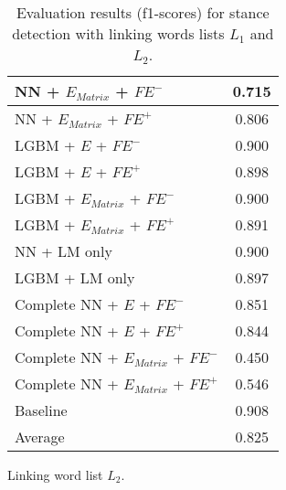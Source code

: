 \begin{table}[h]
\begin{subtable}{.5\textwidth}
\begin{tabular}{|| l || c ||}
 			\hline
 			NN + $E_{Matrix}$ + $\textit{FE}^-$ & 0.715 \\
 			\hline
 			NN + $E_{Matrix}$ + $\textit{FE}^+$ & 0.806 \\
 			\hline
 			LGBM + $E$ + $\textit{FE}^-$ & 0.900 \\
 			\hline
 			LGBM + $E$ + $\textit{FE}^+$ & 0.898 \\
 			\hline
 			LGBM + $E_{Matrix}$ + $\textit{FE}^-$ & 0.900 \\
 			\hline
 			LGBM + $E_{Matrix}$ + $\textit{FE}^+$ & 0.891 \\
 			\hline
 			NN + LM only & 0.900 \\
 			\hline
 			LGBM + LM only & 0.897 \\
 			\hline
 			Complete NN + $E$ + $\textit{FE}^-$ & 0.851 \\
 			\hline
 			Complete NN + $E$ + $\textit{FE}^+$ & 0.844 \\
 			\hline
 			Complete NN + $E_{Matrix}$ + $\textit{FE}^-$ & 0.450 \\
 			\hline
 			Complete NN + $E_{Matrix}$ + $\textit{FE}^+$ & 0.546 \\
 			\hline
 			Baseline & 0.908 \\
 			\hline
 			\hline
 			Average & 0.825 \\
 			\hline
		\end{tabular}
		\renewcommand{\arraystretch}{1}
  		\caption{Linking word list $L_2$.}%
  	\end{subtable}
  	\caption{Evaluation results (f1-scores) for stance detection with linking words lists $L_1$ and $L_2$.}%
  	\label{fig:stanceresults}
\end{table}

